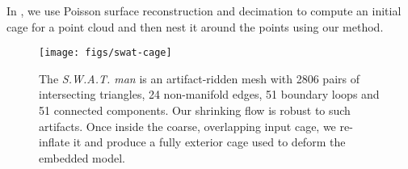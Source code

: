 In , we use Poisson surface reconstruction and decimation
to compute an initial cage for a point cloud and then nest it around the points
using our method.

\begin{figure}
  \texttt{[image: figs/swat-cage]}
  \caption{The \emph{S.W.A.T. man} is an artifact-ridden mesh with 2806 pairs
  of intersecting triangles, 24 non-manifold edges, 51 boundary loops and 51
  connected components. Our shrinking flow is robust to such artifacts. Once
  inside the coarse, overlapping input cage, we re-inflate it and produce a
  fully exterior cage used to deform the embedded model.}
  \label{fig:swat-cage}
\end{figure}
